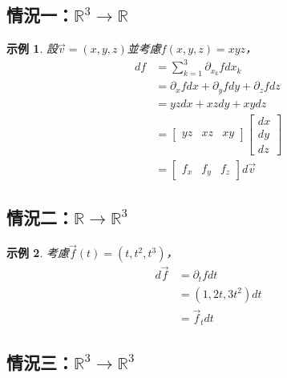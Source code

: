 \documentclass[12pt]{article}
\newtheorem*{example}{示例}
\begin{document}
    \subsection*{情況一：$\mathbb{R}^3\to\mathbb{R}$}

    \begin{example}
        設$\vec{v}=(x,y,z)$並考慮$f(x,y,z)=xyz$，\begin{align*}
            df&=\sum_{k=1}^{3}\partial_{x_k}f dx_k\\
            &=\partial_x f dx + \partial_y f dy + \partial_z f dz\\
            &=yz dx+ xz dy + xy dz\\
            &=\begin{bmatrix}
                yz&xz&xy
            \end{bmatrix}\begin{bmatrix}
                dx\\dy\\dz
            \end{bmatrix}\\
            &=\begin{bmatrix}
                f_x&f_y&f_z
            \end{bmatrix}d\vec{v}
        \end{align*}
    \end{example}

    \subsection*{情況二：$\mathbb{R}\to\mathbb{R}^3$}

    \begin{example}
        考慮$\vec{f}(t)=(t,t^2,t^3)$，\begin{align*}
            d\vec{f}&=\partial_t f dt\\
            &=(1,2t,3t^2)dt\\
            &=\vec{f}_t dt
        \end{align*}
    \end{example}

    \subsection*{情況三：$\mathbb{R}^3\to\mathbb{R}^3$}
\end{document}

